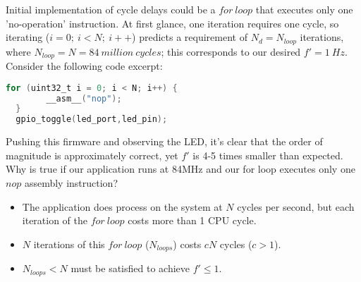 \documentclass[a4paper,12pt]{article}   	%
\begin{document}
\large
\begin{flushleft}
Initial implementation of cycle delays could be a 
$for\ loop$ that executes only one 'no-operation' instruction. At first 
glance, one iteration requires one cycle, so iterating ($i = 0;\ i < N;\ i++$)
predicts a requirement of $N_d = N_{loop}$ iterations, where $N_{loop} = N = 84\ million\ cycles$;
this corresponds to our desired $f'= 1\ Hz$.\\[2 ex] 

Consider the following code excerpt:\\[1 ex] 

\begin{lstlisting}[backgroundcolor = \color{beige},
                    language = C,
                    xleftmargin = 2cm,
                    framexleftmargin = 1em]
  for (uint32_t i = 0; i < N; i++) {
        __asm__("nop");
  }
  gpio_toggle(led_port,led_pin);
  \end{lstlisting}

Pushing this firmware and
observing the LED, it's clear that the order of magnitude is approximately correct, 
yet $f'$ is 4-5 times smaller than expected. Why is true 
if our application runs at 84MHz and our for loop executes only one $nop$ assembly instruction?\\[1 ex]

\end{flushleft}
\begin{itemize}
\setlength{\itemindent}{0.4in}
    \item The application does process on the system at $N$ cycles per second, 
    but each iteration of the $for\ loop$ costs more than 1 CPU cycle. 
    \item $N$ iterations of this $for\ loop$ ($N_{loops}$) costs $cN$ cycles ($c > 1$).
    \item $N_{loops} < N$ must be satisfied to achieve $f' \le 1.$
\end{itemize}
\end{document}
